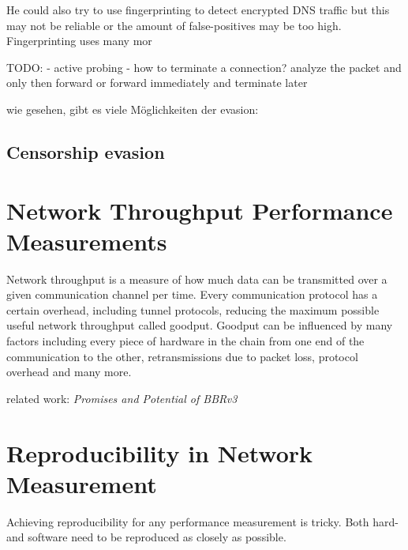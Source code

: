 He could also try to use fingerprinting to detect encrypted DNS traffic but this may not be reliable or the amount of false-positives may be too high.
Fingerprinting uses many mor

TODO:
- active probing
- how to terminate a connection? analyze the packet and only then forward or forward immediately and terminate later


wie gesehen, gibt es viele Möglichkeiten der evasion:

\subsection{Censorship evasion}

\section{Network Throughput Performance Measurements}
Network throughput is a measure of how much data can be transmitted over a given communication channel per time.
Every communication protocol has a certain overhead, including tunnel protocols, reducing the maximum possible useful network throughput called goodput.
Goodput can be influenced by many factors including every piece of hardware in the chain from one end of the communication to the other, retransmissions due to packet loss, protocol overhead and many more.

related work: \textit{Promises and Potential of BBRv3} \cite{Promises-and-Potential-of-BBRv3}

\section{Reproducibility in Network Measurement}
Achieving reproducibility for any performance measurement is tricky. Both hard- and software need to be reproduced as closely as possible.

